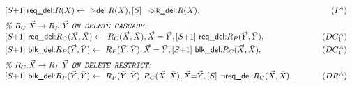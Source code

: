 \documentclass[twoside,11pt]{article}
\theoremstyle{lines}
\theoremstyle{longplain}
\def\rdel{\itorsf{req\_del:}}
\def\bdel{\itorsf{blk\_del:}}
\begin{document}
\begin{Theorem}
\begin{displaymath}
  \begin{array}{l@{\ }r}
    \sterm{S{+}1}\,\rdel R(\bar X) \la\  \extev \del
    R(\bar X), \sterm{S}\ \neg \bdel R(\bar X).  & (I^A) \medskip \\ 
    \textit{\% $R_{C}.\vec X \to R_{P}.\vec Y$ \texttt{ON DELETE
        CASCADE}:} \\ 
    \sterm{S{+}1}\ \rdel R_C(\vec X,\bar X) \la\ R_C(\vec X, \bar X),
    \vec X = \vec Y, \sterm{S{+}1}\ \rdel R_P(\vec Y,\bar Y), &
    (DC_1^A) \smallskip \\ 
    \sterm{S{+}1}\ \bdel R_P(\vec Y,\bar Y) \la\ R_P(\vec Y,\bar Y),
    \vec X = \vec Y, \sterm{S{+}1}\ \bdel R_C(\vec X,\bar X).  &
    (DC_1^A) \medskip \\ 
    \textit{\% $R_{C}.\vec X \to R_{P}.\vec Y$ \texttt{ON DELETE
        RESTRICT}:} \\ 
    \sterm{S{+}1}\ \bdel R_P(\vec Y,\bar Y) \la\ R_P(\vec Y,\bar Y),
    R_C(\vec X,\bar X), \vec X {=} \vec Y, \sterm{S}\ \neg \rdel
    R_C(\vec X,\bar X). \hspace{1.2cm}  & (DR^A)
\end{array}
\end{displaymath}
\end{Theorem}
\end{document}
